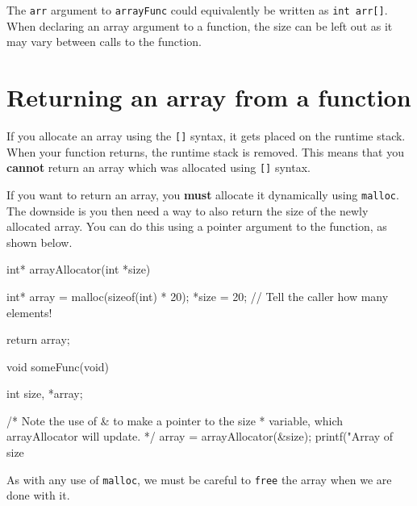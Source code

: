 The \lstinline!arr! argument to \lstinline!arrayFunc! could equivalently be written as \lstinline!int arr[]!.
When declaring an array argument to a function, the size can be left out as it may vary between calls to the function.

\section{Returning an array from a function}

If you allocate an array using the \texttt{[]} syntax, it gets placed on the runtime stack.
When your function returns, the runtime stack is removed.
This means that you \textbf{cannot} return an array which was allocated using \texttt{[]} syntax.

If you want to return an array, you \textbf{must} allocate it dynamically using \texttt{malloc}.
The downside is you then need a way to also return the size of the newly allocated array.
You can do this using a pointer argument to the function, as shown below.

\begin{codeblock}
int* arrayAllocator(int *size) {
    int* array = malloc(sizeof(int) * 20);
    *size = 20; // Tell the caller how many elements!

    return array;
}

void someFunc(void) {
    int size, *array;

    /* Note the use of & to make a pointer to the size
     * variable, which arrayAllocator will update.
     */
    array = arrayAllocator(&size);
    printf("Array of size %
}
\end{codeblock}

As with any use of \lstinline!malloc!, we must be careful to \lstinline!free! the array when we are done with it.
